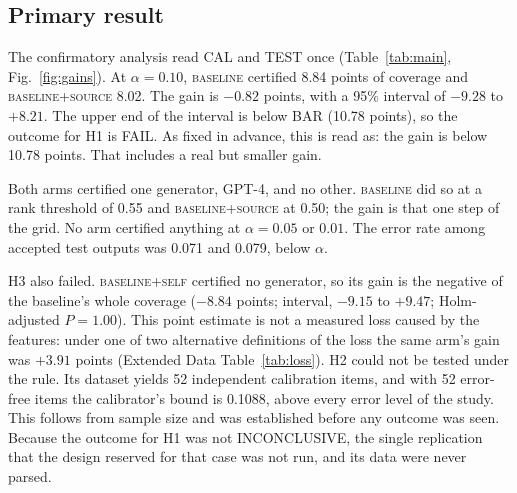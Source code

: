 \documentclass[11pt]{article}
\newcommand{\arm}[1]{\textsc{#1}}
\begin{document}
\subsection*{Primary result}

The confirmatory analysis read CAL and TEST once (Table~\ref{tab:main}, Fig.~\ref{fig:gains}). At $\alpha = 0.10$, \arm{baseline} certified 8.84 points of coverage and \arm{baseline+source} 8.02. The gain is $-0.82$ points, with a 95\% interval of $-9.28$ to $+8.21$. The upper end of the interval is below BAR (10.78 points), so the outcome for H1 is FAIL. As fixed in advance, this is read as: the gain is below 10.78 points. That includes a real but smaller gain.

Both arms certified one generator, GPT-4, and no other. \arm{baseline} did so at a rank threshold of 0.55 and \arm{baseline+source} at 0.50; the gain is that one step of the grid. No arm certified anything at $\alpha = 0.05$ or $0.01$. The error rate among accepted test outputs was 0.071 and 0.079, below $\alpha$.

H3 also failed. \arm{baseline+self} certified no generator, so its gain is the negative of the baseline's whole coverage ($-8.84$ points; interval, $-9.15$ to $+9.47$; Holm-adjusted $P = 1.00$). This point estimate is not a measured loss caused by the features: under one of two alternative definitions of the loss the same arm's gain was $+3.91$ points (Extended Data Table~\ref{tab:loss}). H2 could not be tested under the rule. Its dataset\cite{selfcheck} yields 52 independent calibration items, and with 52 error-free items the calibrator's bound is 0.1088, above every error level of the study. This follows from sample size and was established before any outcome was seen. Because the outcome for H1 was not INCONCLUSIVE, the single replication that the design reserved for that case was not run, and its data were never parsed.
\end{document}
